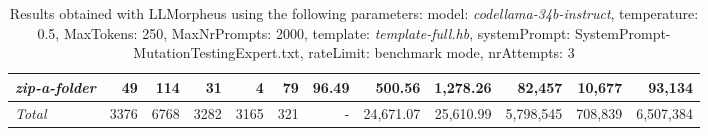 \begin{table*}
{\begin{tabular}{l||r|r|r|r|r|r||r|r||r|r|r}
   \hline
   \textit{zip-a-folder} & 49 & 114 & 31 & 4 & 79 & 96.49 & 500.56 & 1,278.26 & 82,457 & 10,677 & 93,134 \\ 
   \hline
   \textit{Total} & 3376 & 6768 & 3282 & 3165 & 321 & - & 24,671.07  & 25,610.99 & 5,798,545 & 708,839 & 6,507,384 \\ 
 \end{tabular}
 }
 \caption{Results obtained with LLMorpheus using the following parameters: 
   model: \textit{codellama-34b-instruct}, 
   temperature: 0.5, 
   MaxTokens: 250, 
   MaxNrPrompts: 2000, 
   template: \textit{template-full.hb}, 
   systemPrompt: SystemPrompt-MutationTestingExpert.txt, 
   rateLimit: benchmark mode, 
   nrAttempts: 3  
 }
\end{table*}

